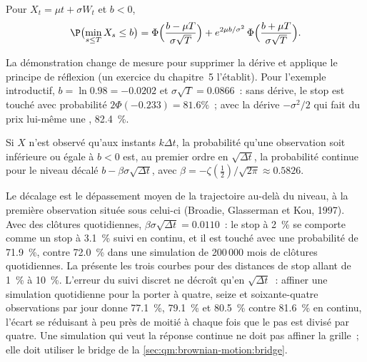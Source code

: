 \begin{proposition}\label{prop:qm:brownian-motion:driftpassage}
Pour $X_t = \mu t + \sigma W_t$ et $b < 0$,
\[
\P\bigl(\min_{s \le T}X_s \le b\bigr) = \Phi\Bigl(\frac{b - \mu T}{\sigma\sqrt T}\Bigr) +
e^{2\mu b/\sigma^2}\,\Phi\Bigl(\frac{b + \mu T}{\sigma\sqrt T}\Bigr).
\]
\end{proposition}

\admitted

La démonstration change de mesure pour supprimer la dérive et applique le principe de réflexion
(un exercice du chapitre~5 l'établit). Pour l'exemple introductif,
$b = \ln 0.98 = -0.0202$ et $\sigma\sqrt T = 0.0866$~: sans dérive, le stop est touché avec
probabilité $2\Phi(-0.233) = 81.6\%$~; avec la dérive $-\sigma^2/2$ qui fait du prix lui-même
une , 82.4~\%.

\begin{proposition}\label{prop:qm:brownian-motion:bgk}
Si $X$ n'est observé qu'aux instants $k\Delta t$, la probabilité qu'une observation soit
inférieure ou égale à $b < 0$ est, au premier ordre en $\sqrt{\Delta t}$, la probabilité continue pour le
niveau décalé $b - \beta\sigma\sqrt{\Delta t}$, avec $\beta = -\zeta(\tfrac12)/\sqrt{2\pi} \approx
0.5826$.
\end{proposition}

\admitted

Le décalage est le dépassement moyen de la trajectoire au-delà du niveau, à la première observation située
sous celui-ci (Broadie, Glasserman et Kou, 1997). Avec des clôtures quotidiennes, $\beta\sigma\sqrt{\Delta t} =
0.0110$~: le stop à 2~\% se comporte comme un stop à 3.1~\% suivi en continu, et il est touché avec
une probabilité de 71.9~\%, contre 72.0~\% dans une simulation de 200\,000 mois de clôtures quotidiennes.
La  présente les trois courbes pour des distances de stop allant de 1~\% à
10~\%. L'erreur du suivi discret ne décroît qu'en $\sqrt{\Delta t}$~: affiner une simulation quotidienne
pour la porter à quatre, seize et soixante-quatre observations par jour donne 77.1~\%, 79.1~\% et 80.5~\%
contre 81.6~\% en continu, l'écart se réduisant à peu près de moitié à chaque fois que le pas est divisé par
quatre. Une simulation qui veut la réponse continue ne doit pas affiner la grille~; elle doit utiliser
le bridge de la \cref{sec:qm:brownian-motion:bridge}.

